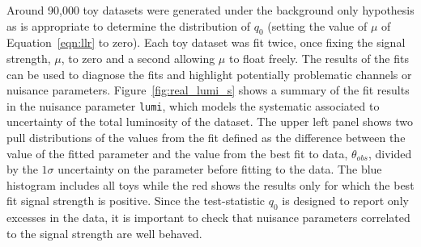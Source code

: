 Around 90,000 toy datasets were generated under the background only hypothesis as is 
appropriate to determine the distribution of $q_{0}$ (setting the value of $\mu$ of 
Equation~\ref{eqn:llr} to zero). Each toy dataset was fit twice, once fixing the signal 
strength, $\mu$, to zero and a second allowing $\mu$ to float freely.
The results of the fits can be used to diagnose the fits and highlight 
potentially problematic channels or nuisance parameters. 
Figure~\ref{fig:real_lumi_s} shows a summary of the fit results 
in the nuisance parameter \texttt{lumi}, 
which models the systematic associated to uncertainty of the total luminosity of the dataset.
The upper left panel shows two pull distributions of the values from the fit defined as the 
difference between the value of the fitted parameter
and the value from the best fit to data, $\theta_{obs}$, divided by 
the $1\sigma$ uncertainty on the parameter before fitting to the data. 
The blue histogram includes all toys while the red shows the results
only for which the best fit signal strength is positive. Since the test-statistic $q_{0}$ 
is designed to report only excesses in the data,
it is important to check that nuisance parameters correlated to the signal 
strength are well behaved.

